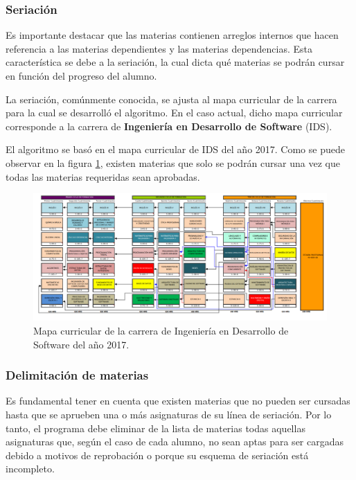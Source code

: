 \subsubsection{Seriación}
Es importante destacar que las materias contienen arreglos internos que hacen referencia a las materias dependientes y las materias dependencias. Esta característica se debe a la seriación, la cual dicta qué materias se podrán cursar en función del progreso del alumno. %

La seriación, comúnmente conocida, se ajusta al mapa curricular de la carrera para la cual se desarrolló el algoritmo. En el caso actual, dicho mapa curricular corresponde a la carrera de \textbf{Ingeniería en Desarrollo de Software} (IDS). %

El algoritmo se basó en el mapa curricular de IDS del año 2017. Como se puede observar en la figura \ref{fig:mapa_curricular_ids_2017}, existen materias que solo se podrán cursar una vez que todas las materias requeridas sean aprobadas. %

\begin{figure}[h]
    \centering
    \includegraphics[width=\textwidth]{images/mapa_curricular.png}
    \caption{Mapa curricular de la carrera de Ingeniería en Desarrollo de Software del año 2017.}
    \label{fig:mapa_curricular_ids_2017}
\end{figure}


\subsubsection{Delimitación de materias} \label{delmitacion_de_materias}
Es fundamental tener en cuenta que existen materias que no pueden ser cursadas hasta que se aprueben una o más asignaturas de su línea de seriación. Por lo tanto, el programa debe eliminar de la lista de materias todas aquellas asignaturas que, según el caso de cada alumno, no sean aptas para ser cargadas debido a motivos de reprobación o porque su esquema de seriación está incompleto. %

